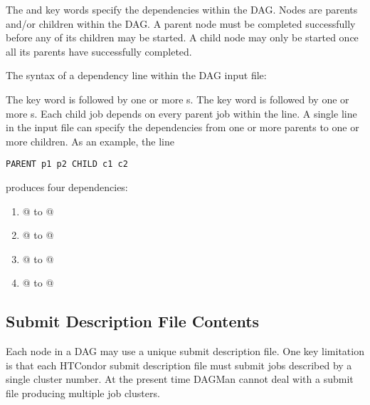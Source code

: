 \begin{itemize}
The  and  key words specify the
dependencies within the DAG.
Nodes are parents and/or children within the DAG.
A parent node must be completed successfully before
any of its children may be started.
A child node may only be started once
all its parents have successfully completed.

The syntax of a dependency line within the DAG input file:

   

The  key word is followed by one or more
s.
The  key word is followed by one or more
s.
Each child job depends on every parent job within the line.
A single line in the input file can specify the dependencies from one or more
parents to one or more children.
As an example, the line
\begin{verbatim}
PARENT p1 p2 CHILD c1 c2
\end{verbatim}
produces four dependencies:
\begin{enumerate}
\item{@ to @}
\item{@ to @}
\item{@ to @}
\item{@ to @}
\end{enumerate}

\end{itemize}

\subsection{Submit Description File Contents}

Each node in a DAG may use a unique submit description file.
One key limitation is that
each HTCondor submit description file must submit jobs
described by a single cluster number.
At the present time DAGMan cannot deal with a submit file producing
multiple job clusters.

